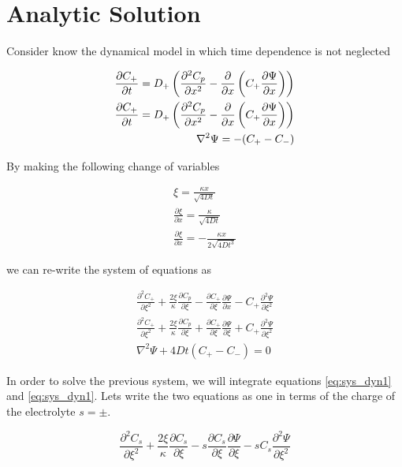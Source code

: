 \section{Analytic Solution}

Consider know the dynamical model in which time dependence is not neglected

\begin{eqnarray}
	\frac{\partial C_+}{\partial t} = D_+\left({\frac{\partial^2 C_p}{\partial x^2} - \frac{\partial}{\partial x}\left({C_+\frac{\partial\Psi}{\partial x}}\right)}\right) \\
	\frac{\partial C_+}{\partial t} = D_+\left({\frac{\partial^2 C_p}{\partial x^2} - \frac{\partial}{\partial x}\left({C_+\frac{\partial\Psi}{\partial x}}\right)}\right) \\
	\nabla^2 \Psi = -(C_+-C_-)
\end{eqnarray}

By making the following change of variables 

\begin{eqnarray}
	\xi = \frac{\kappa x}{\sqrt{4Dt}}\\
	\frac{\partial \xi}{\partial x} = \frac{\kappa}{\sqrt{4Dt}}\\
	\frac{\partial \xi}{\partial x} = -\frac{\kappa x}{2\sqrt{4Dt^3}}
\end{eqnarray}

we can re-write the system of equations as

\begin{eqnarray}
	\label{eq:sys_dyn1}
	\frac{\partial^2 C_+}{\partial \xi^2} + \frac{2\xi}{\kappa}\frac{\partial C_p}{\partial \xi}  -\frac{\partial C_+}{\partial \xi}\frac{\partial \Psi}{\partial x}-C_+\frac{\partial^2\Psi}{\partial \xi^2} \\
	\label{eq:sys_dyn2}
	\frac{\partial^2 C_+}{\partial \xi^2} + \frac{2\xi}{\kappa}\frac{\partial C_p}{\partial \xi}  +\frac{\partial C_+}{\partial \xi}\frac{\partial \Psi}{\partial \xi}+C_+\frac{\partial^2\Psi}{\partial \xi^2} \\
	\label{eq:sys_dyn3}
	\nabla^2 \Psi + 4Dt(C_+-C_-) = 0
\end{eqnarray}

In order to solve the previous system, we will integrate equations \ref{eq:sys_dyn1} and \ref{eq:sys_dyn1}. Lets write the two equations as one in terms of the charge of the electrolyte $s=\pm$.

\begin{equation}
	\frac{\partial^2 C_s}{\partial \xi^2} + \frac{2\xi}{\kappa}\frac{\partial C_s}{\partial \xi}  -s\frac{\partial C_s}{\partial \xi}\frac{\partial \Psi}{\partial \xi}-sC_s\frac{\partial^2\Psi}{\partial \xi^2}
\end{equation}

